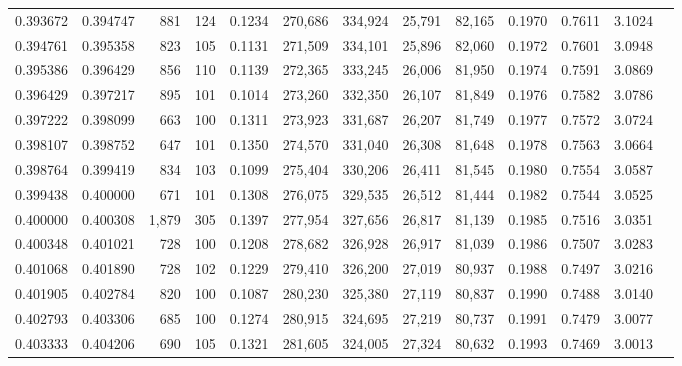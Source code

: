 \begin{tabular}{rrrrrrrrrrrrr}
0.393672 & 0.394747 &    881 &   124 &                                     0.1234 & 270,686 & 334,924 &  25,791 &  82,165 & 0.1970 & 0.7611 & 3.1024 \\
0.394761 & 0.395358 &    823 &   105 &                                     0.1131 & 271,509 & 334,101 &  25,896 &  82,060 & 0.1972 & 0.7601 & 3.0948 \\
0.395386 & 0.396429 &    856 &   110 &                                     0.1139 & 272,365 & 333,245 &  26,006 &  81,950 & 0.1974 & 0.7591 & 3.0869 \\
0.396429 & 0.397217 &    895 &   101 &                                     0.1014 & 273,260 & 332,350 &  26,107 &  81,849 & 0.1976 & 0.7582 & 3.0786 \\
0.397222 & 0.398099 &    663 &   100 &                                     0.1311 & 273,923 & 331,687 &  26,207 &  81,749 & 0.1977 & 0.7572 & 3.0724 \\
0.398107 & 0.398752 &    647 &   101 &                                     0.1350 & 274,570 & 331,040 &  26,308 &  81,648 & 0.1978 & 0.7563 & 3.0664 \\
0.398764 & 0.399419 &    834 &   103 &                                     0.1099 & 275,404 & 330,206 &  26,411 &  81,545 & 0.1980 & 0.7554 & 3.0587 \\
0.399438 & 0.400000 &    671 &   101 &                                     0.1308 & 276,075 & 329,535 &  26,512 &  81,444 & 0.1982 & 0.7544 & 3.0525 \\
0.400000 & 0.400308 &  1,879 &   305 &                                     0.1397 & 277,954 & 327,656 &  26,817 &  81,139 & 0.1985 & 0.7516 & 3.0351 \\
0.400348 & 0.401021 &    728 &   100 &                                     0.1208 & 278,682 & 326,928 &  26,917 &  81,039 & 0.1986 & 0.7507 & 3.0283 \\
0.401068 & 0.401890 &    728 &   102 &                                     0.1229 & 279,410 & 326,200 &  27,019 &  80,937 & 0.1988 & 0.7497 & 3.0216 \\
0.401905 & 0.402784 &    820 &   100 &                                     0.1087 & 280,230 & 325,380 &  27,119 &  80,837 & 0.1990 & 0.7488 & 3.0140 \\
0.402793 & 0.403306 &    685 &   100 &                                     0.1274 & 280,915 & 324,695 &  27,219 &  80,737 & 0.1991 & 0.7479 & 3.0077 \\
0.403333 & 0.404206 &    690 &   105 &                                     0.1321 & 281,605 & 324,005 &  27,324 &  80,632 & 0.1993 & 0.7469 & 3.0013 \\

\end{tabular}
